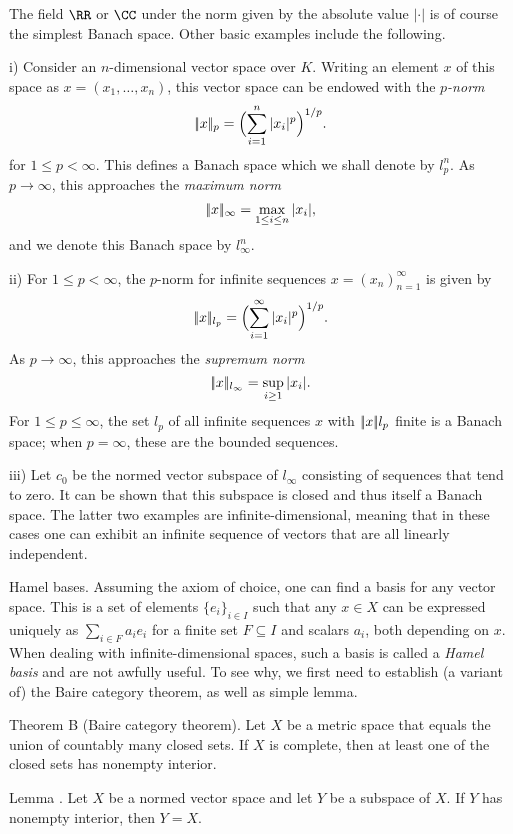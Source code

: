 The field $\RR$ or $\CC$ under the norm given by the absolute value $|\cdot|$ is of course the
simplest Banach space. Other basic examples include the following.
\medskip
\item{i)} Consider an $n$-dimensional vector space over $K$. Writing an element $x$ of this space
as $x = (x_1, \ldots, x_n)$, this vector space can be endowed with the {\it $p$-norm}
$$|\!|x|\!|_p = \Bigl(\sum_{i=1}^n |x_i|^p\Bigr)^{1/p}.$$
for $1\le p<\infty$. This defines a Banach space which we shall denote by $l_p^n$. As $p\to\infty$,
this approaches the {\it maximum norm}
$$|\!|x|\!|_\infty = \max_{1\le i\le n} |x_i|,$$
and we denote this Banach space by $l_\infty^n$.
\smallskip
\item{ii)} For $1\le p< \infty$, the $p$-norm for infinite sequences $x = (x_n)_{n=1}^\infty$ is given by
$$|\!|x|\!|_{l_p} = \Bigl(\sum_{i=1}^\infty |x_i|^p \Bigr)^{1/p}.$$
As $p\to\infty$, this approaches the {\it supremum norm}
$$|\!|x|\!|_{l_\infty} = \sup_{i\ge 1} |x_i|.$$
For $1\le p\le \infty$, the set $l_p$ of all infinite sequences $x$ with $|\!|x|\!|{l_p}$ finite is a Banach space;
when $p=\infty$, these are the bounded sequences.
\smallskip
\item{iii)} Let $c_0$ be the normed vector subspace of $l_\infty$ consisting of sequences that tend to zero.
It can be shown that this subspace is closed and thus itself a Banach space.
\medskip
The latter two examples are infinite-dimensional, meaning that in these cases one can exhibit an
infinite sequence of vectors that are all linearly independent.

\medskip\boldlabel Hamel bases.
Assuming the axiom of choice, one can
find a basis for any vector space. This is a set of elements $\{e_i\}_{i\in I}$ such that any
$x\in X$ can be expressed uniquely as $\sum_{i\in F} a_ie_i$ for a finite set $F\subseteq I$
and scalars $a_i$, both depending on $x$.
When dealing with infinite-dimensional spaces, such a basis
is called a {\it Hamel basis} and are not awfully useful. To see why, we first need to establish (a variant of)
the Baire category theorem, as well as simple lemma.

\parenproclaim Theorem B (Baire category theorem). Let $X$ be a metric space that equals the union of
countably many closed sets. If $X$ is complete, then at least one of the closed sets has nonempty interior.\slug

\proclaim Lemma \advthm. Let $X$ be a normed vector space and let $Y$ be a subspace of $X$. If $Y$ has nonempty
interior, then $Y=X$.

